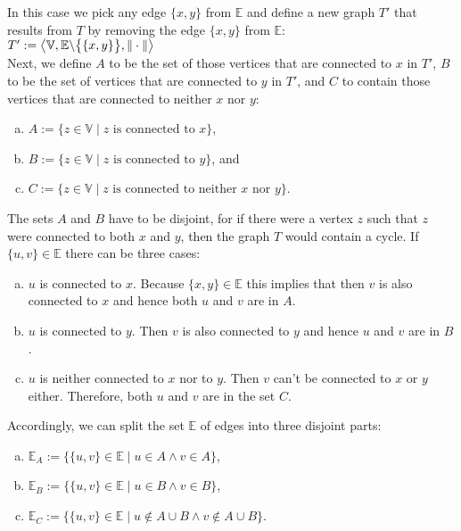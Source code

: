 \begin{enumerate}
  In this case we pick any edge $\{x,y\}$ from $\mathbb{E}$ and define a new graph $T'$ that results from $T$
  by removing the edge $\{x,y\}$ from $\mathbb{E}$:
  \\[0.2cm]
  \hspace*{1.3cm}
  $T' := \bigl\langle \mathbb{V}, \mathbb{E} \backslash \bigl\{ \{x,y\} \bigr\}, \|\cdot\| \bigr\rangle$ 
  \\[0.2cm]
  Next, we define $A$ to be the set of those vertices that are connected to $x$ in $T'$, $B$ to be the set
  of vertices that are connected to $y$ in $T'$, and $C$ to contain those vertices that are connected to
  neither $x$ nor $y$:
  \begin{enumerate}[(a)]
  \item $A := \{ z \in \mathbb{V} \mid \mbox{$z$ is connected to $x$}\}$, \quad 
  \item $B := \{ z \in \mathbb{V} \mid \mbox{$z$ is connected to $y$}\}$, \quad and \quad
  \item $C := \{ z \in \mathbb{V} \mid \mbox{$z$ is connected to neither $x$ nor $y$}\}$.
  \end{enumerate}
  The sets $A$ and $B$ have to be disjoint, for if there were a vertex $z$ such that $z$ were connected to both
  $x$ and $y$, then the graph $T$ would contain a cycle.  If $\{u,v\}\in\mathbb{E}$ there can be three cases:
  \begin{enumerate}[(a)]
  \item $u$ is connected to $x$.  Because $\{x,y\}\in\mathbb{E}$ this implies that then $v$ is also connected
        to $x$ and hence both $u$ and $v$ are in $A$.
  \item $u$ is connected to $y$.  Then $v$ is also connected to $y$ and hence $u$ and $v$ are in $B$.
  \item $u$ is neither connected to $x$ nor to $y$.  Then $v$ can't be connected to $x$ or $y$ either.
        Therefore, both $u$ and $v$ are in the set $C$.
  \end{enumerate}
  Accordingly, we can split the set $\mathbb{E}$ of edges into three disjoint parts:
  \begin{enumerate}[(a)]
  \item $\mathbb{E}_A := \bigl\{ \{u,v\}\in\mathbb{E} \mid u\in A \wedge v\in A \bigr\}$,
  \item $\mathbb{E}_B := \bigl\{ \{u,v\}\in\mathbb{E} \mid u\in B \wedge v\in B \bigr\}$,
  \item $\mathbb{E}_C := \bigl\{ \{u,v\}\in\mathbb{E} \mid u\not\in A \cup B \wedge v\not\in A \cup B \bigr\}$.

\end{enumerate}
\end{enumerate}
